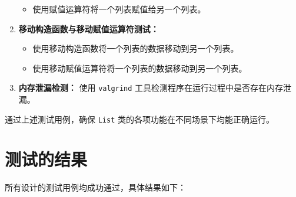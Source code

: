 \documentclass[UTF8]{ctexart}
\begin{document}
\begin{enumerate}
\begin{itemize}
        \item 使用赋值运算符将一个列表赋值给另一个列表。
    \end{itemize}
    \item \textbf{移动构造函数与移动赋值运算符测试：} 
    \begin{itemize}
        \item 使用移动构造函数将一个列表的数据移动到另一个列表。
        \item 使用移动赋值运算符将一个列表的数据移动到另一个列表。
    \end{itemize}
    \item \textbf{内存泄漏检测：} 使用 \texttt{valgrind} 工具检测程序在运行过程中是否存在内存泄漏。
\end{enumerate}

通过上述测试用例，确保 \texttt{List} 类的各项功能在不同场景下均能正确运行。

\section{测试的结果}

所有设计的测试用例均成功通过，具体结果如下：
\end{document}
